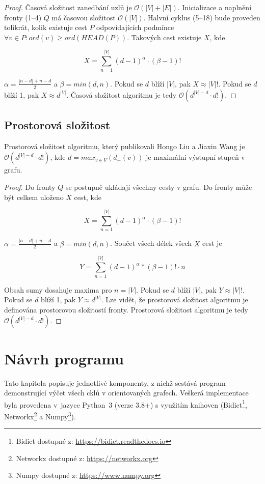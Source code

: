         \begin{proof}
            Časová složitost zanedbání uzlů je $\mathcal{O}(|V| + |E|)$. Inicializace a naplnění fronty (1--4) $Q$ má časovou složitost $\mathcal{O}(|V|)$. Halvní cyklus (5--18) bude proveden tolikrát, kolik existuje cest $P$ odpovídajících podmínce  $\forall v \in P: ord(v) \geq ord(HEAD(P))$. Takových cest existuje $X$, kde

            $$
            X = \sum_{n = 1}^{|V|}(d-1)^\alpha\cdot(\beta -1)!
            $$

            \noindent $\alpha = \frac{|n - d| + n - d}{2}$ a $\beta = min(d, n)$. Pokud se $d$ blíží $|V|$, pak $X \approx |V|!$. Pokud se $d$ blíží 1, pak $X \approx d^{|V|}$. Časová složitost algoritmu je tedy $\mathcal{O}(d^{|V|-d}\cdot d!)$.

        \end{proof}

    \section{Prostorová složitost}
        \begin{theorem}
            Prostorová složitost algoritmu, který publikovali Hongo Liu a Jiaxin Wang je $\mathcal{O}(d^{|V|-d}\cdot d!)$, kde $d = max_{v\in V}(d_-(v))$ je maximální výstupní stupeň v grafu.
        \end{theorem}

        \begin{proof}
            Do fronty $Q$ se postupně ukládají všechny cesty v grafu. Do fronty může být celkem uloženo $X$ cest, kde

            $$
            X = \sum_{n = 1}^{|V|}(d-1)^\alpha\cdot(\beta -1)!
            $$

            \noindent $\alpha = \frac{|n - d| + n - d}{2}$ a $\beta = min(d, n)$. Součet všech délek všech $X$ cest je

            $$
            Y = \sum_{n = 1}^{|V|}(d-1)^\alpha*(\beta -1)! \cdot n
            $$

            \noindent Obsah sumy dosahuje maxima pro $n = |V|$. Pokud se $d$ blíží $|V|$, pak $Y \approx |V|!$. Pokud  se $d$ blíží 1, pak $Y \approx d^{|V|}$. Lze vidět, že prostorová složitost algoritmu je definována prostorovou složitostí fronty. Prostorová složitost algoritmu je tedy $\mathcal{O}(d^{|V|-d}\cdot d!)$.
        \end{proof}

\chapter{Návrh programu}
    \label{chapter:Design}
    Tato kapitola popisuje jednotlivé komponenty, z nichž sestává program  demonstrující výčet všech cklů v orientovaných grafech. Veškerá implementace byla provedena v~jazyce Python~3 (verze 3.8+) s využitím knihoven (Bidict\footnote{Bidict dostupné z: \url{https://bidict.readthedocs.io}}, Networkx\footnote{Networkx dostupné z: \url{https://networkx.org}} a Numpy\footnote{Numpy dostupné z: \url{https://www.numpy.org}}).

